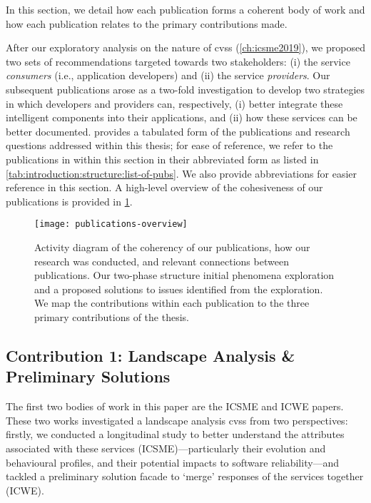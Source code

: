 In this section, we detail how each publication forms a coherent body of work and how each publication relates to the primary contributions made.

After our exploratory analysis on the nature of \glspl{cvs} (\cref{ch:icsme2019}), we proposed two sets of recommendations targeted towards two stakeholders: (i) the service \textit{consumers} (i.e., application developers) and (ii) the service \textit{providers}. Our subsequent publications arose as a two-fold investigation to develop two strategies in which developers and providers can, respectively, (i) better integrate these intelligent components into their applications, and (ii) how these services can be better documented.  provides a tabulated form of the publications and research questions addressed within this thesis; for ease of reference, we refer to the publications in within this section in their abbreviated form as listed in \cref{tab:introduction:structure:list-of-pubs}. We also provide abbreviations for easier reference in this section. A high-level overview of the cohesiveness of our publications is provided in \cref{fig:introduction:structure:publications-overview}.

\begin{figure}[hbt]
  \texttt{[image: publications-overview]}
  \caption[Overview publication coherency]{Activity diagram of the coherency of our publications, how our research was conducted, and relevant connections between publications. Our two-phase structure initial phenomena exploration and a proposed solutions to issues identified from the exploration. We map the contributions within each publication to the three primary contributions of the thesis.}
  \label{fig:introduction:structure:publications-overview}
\end{figure}

\subsection{Contribution 1: Landscape Analysis \& Preliminary Solutions}

The first two bodies of work in this paper are the ICSME and ICWE papers. These two works investigated a landscape analysis \glspl{cvs} from two perspectives: firstly, we conducted a longitudinal study to better understand the attributes associated with these services (ICSME)---particularly their evolution and behavioural profiles, and their potential impacts to software reliability---and tackled a preliminary solution facade to `merge' responses of the services together (ICWE). 

